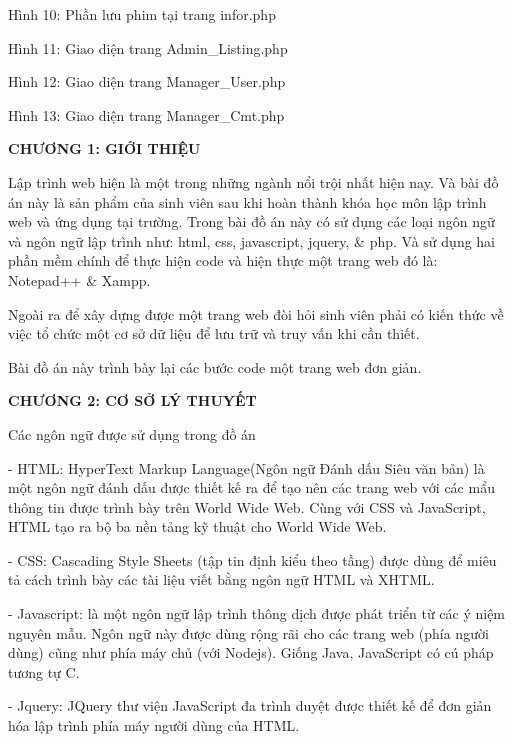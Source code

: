 \documentclass{report}
\begin{document}
\smallskip
Hình 10: Phần lưu phim tại trang infor.php


\smallskip
Hình 11: Giao diện trang Admin\_Listing.php


\smallskip
Hình 12: Giao diện trang Manager\_User.php


\smallskip
Hình 13: Giao diện trang Manager\_Cmt.php




\bigskip
\changefontsizes{13pt}


\newpage
\changefontsizes{16pt}
\centerline{\textbf{CHƯƠNG 1: GIỚI THIỆU}}

\bigskip
\changefontsizes{13pt}
\setlength{\parindent}{1cm}
Lập trình web hiện là một trong những ngành nổi trội nhất hiện nay. Và bài đồ án này là sản phẩm của sinh viên sau khi hoàn thành khóa học môn lập trình web và ứng dụng tại trường. Trong bài đồ án này có sử dụng các loại ngôn ngữ và ngôn ngữ lập trình như: html, css, javascript, jquery, \& php. Và sử dụng hai phần mềm chính để thực hiện code và hiện thực một trang web đó là: Notepad++ \& Xampp.

Ngoài ra để xây dựng được một trang web đòi hỏi sinh viên phải có kiến thức về việc tổ chức một cơ sở dữ liệu để lưu trữ và truy vấn khi cần thiết.

Bài đồ án này trình bày lại các bước code một trang web đơn giản.

\newpage
\changefontsizes{16pt}
\centerline{\textbf{CHƯƠNG 2: CƠ SỞ LÝ THUYẾT}}

\bigskip
\changefontsizes{14pt}
\setlength{\parindent}{0cm}
Các ngôn ngữ được sử dụng trong đồ án

\changefontsizes{13pt}
\setlength{\parindent}{1cm}
- HTML: HyperText Markup Language(Ngôn ngữ Đánh dấu Siêu văn bản) là một ngôn ngữ đánh dấu được thiết kế ra để tạo nên các trang web với các mẩu thông tin được trình bày trên World Wide Web. Cùng với CSS và JavaScript, HTML tạo ra bộ ba nền tảng kỹ thuật cho World Wide Web.

\smallskip
- CSS: Cascading Style Sheets (tập tin định kiểu theo tầng) được dùng để miêu tả cách trình bày các tài liệu viết bằng ngôn ngữ HTML và XHTML.

\smallskip
- Javascript: là một ngôn ngữ lập trình thông dịch được phát triển từ các ý niệm nguyên mẫu. Ngôn ngữ này được dùng rộng rãi cho các trang web (phía người dùng) cũng như phía máy chủ (với Nodejs). Giống Java, JavaScript có cú pháp tương tự C.

\smallskip
- Jquery: JQuery thư viện JavaScript đa trình duyệt được thiết kế để đơn giản hóa lập trình phía máy người dùng của HTML.
\end{document}
